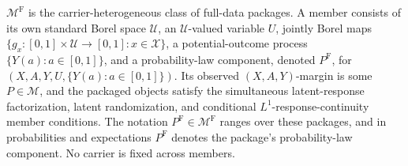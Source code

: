 \(\mathcal M^{\mathrm F}\) is the carrier-heterogeneous class of full-data packages. A member consists of its own standard Borel space \(\mathcal U\), an \(\mathcal U\)-valued variable \(U\), jointly Borel maps \(\{g_x:[0,1]\times\mathcal U\to[0,1]:x\in\mathcal X\}\), a potential-outcome process \(\{Y(a):a\in[0,1]\}\), and a probability-law component, denoted \(P^{\mathrm F}\), for \((X,A,Y,U,\{Y(a):a\in[0,1]\})\). Its observed \((X,A,Y)\)-margin is some \(P\in\mathcal M\), and the packaged objects satisfy the simultaneous latent-response factorization, latent randomization, and conditional \(L^1\)-response-continuity member conditions. The notation \(P^{\mathrm F}\in\mathcal M^{\mathrm F}\) ranges over these packages, and in probabilities and expectations \(P^{\mathrm F}\) denotes the package's probability-law component. No carrier is fixed across members.